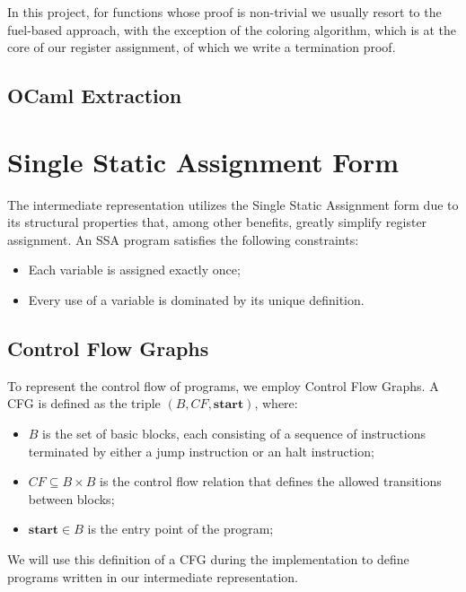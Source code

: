 In this project, for functions whose proof is non-trivial we usually resort to the fuel-based approach, with the exception of the coloring algorithm, which is at the core of our register assignment, of which we write a termination proof.

\subsection{OCaml Extraction}

\section{Single Static Assignment Form}
\label{sec:ssa}

The intermediate representation utilizes the Single Static Assignment form due to its structural properties that, among other benefits, greatly simplify register assignment. An SSA program satisfies the following constraints:

\begin{itemize}
    \item Each variable is assigned exactly once;
    \item Every use of a variable is dominated by its unique definition.
\end{itemize}

\subsection{Control Flow Graphs}
\label{subsec:cfg}

To represent the control flow of programs, we employ Control Flow Graphs. A CFG is defined as the triple $(B, CF, \textbf{start})$, where:

\begin{itemize}
    \item $B$ is the set of basic blocks, each consisting of a sequence of instructions terminated by either a jump instruction or an halt instruction;
    \item $CF \subseteq B \times B$ is the control flow relation that defines the allowed transitions between blocks;
    \item $\textbf{start} \in B$ is the entry point of the program;
\end{itemize}

We will use this definition of a CFG during the implementation to define programs written in our intermediate representation.

